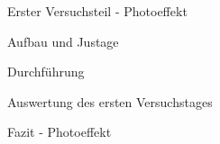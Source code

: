 \documentclass[pdftex, a4paper,11pt, twoside, ngerman]{report}
\begin{document}
  \begin{chapter}{Erster Versuchsteil - Photoeffekt}
    \label{chp:Photoeffekt}
   
   
   
    \begin{section}{Aufbau und Justage}
      \label{chp:photoeffekt:sec:AufbauJustage}
      
      
      
    \end{section}
   
   
   
    \begin{section}{Durchführung}
      \label{chp:Aufbau:sec:ERSTERTEIL:subsec:UNTERTEIL}
      
      
      
    \end{section}
   
   
   
    \begin{section}{Auswertung des ersten Versuchstages}
      \label{chp:Photoeffekt:sec:Auswertung}
      
      
      
    \end{section}
   
   
   
    \begin{section}{Fazit - Photoeffekt}
      \label{chp:Photoeffekt:sec:Fazit}
      
      
      
    \end{section}
   
  \end{chapter}

  
  
  
  
  
  \begin{thebibliography}{99}
    \scriptsize
    
   
  \end{thebibliography}
 
\end{document}
